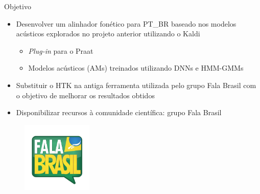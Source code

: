 \begin{frame}{Objetivo}
\begin{itemize}
	\item Desenvolver um alinhador fon\'etico para PT\_BR baseado nos modelos
        ac\'usticos explorados no projeto anterior utilizando o Kaldi
	\begin{itemize}
		\item \textit{Plug-in} para o Praat
		\item Modelos ac\'usticos (AMs) treinados utilizando DNNs e HMM-GMMs
	\end{itemize}
	\item Substituir o HTK na antiga ferramenta utilizada pelo grupo Fala
        Brasil com o objetivo de melhorar os resultados obtidos
    \item Disponibilizar recursos \`a comunidade cient\'ifica: grupo Fala Brasil
\end{itemize}

\begin{figure}
\begin{center}
	\includegraphics[width=0.3\textwidth]{Figures/falabrasil}
\end{center}
\end{figure}

\end{frame}
